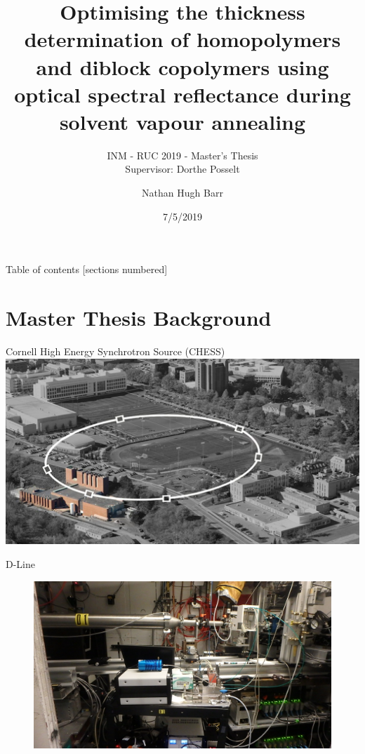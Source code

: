 \documentclass[10pt]{beamer}
\title{Optimising the thickness determination of homopolymers and diblock copolymers using optical spectral reflectance during solvent vapour annealing}
\subtitle{INM - RUC 2019 - Master's Thesis \\ Supervisor: Dorthe Posselt}
\date{7/5/2019}
\author{Nathan Hugh Barr}
\institute{Roskilde University}
\begin{document}
\maketitle

\begin{frame}{Table of contents}
  [sections numbered]
  \tableofcontents[hideallsubsections]
\end{frame}

	\section{Master Thesis Background}

\begin{frame}{Cornell High Energy Synchrotron Source (CHESS)}
	\includegraphics[width=\textwidth]{Ring.jpg}
\end{frame}

\begin{frame}{D-Line}
\begin{figure}
	\includegraphics[scale=0.15]{chess3.JPG}
\end{figure}
\end{frame}
\end{document}
